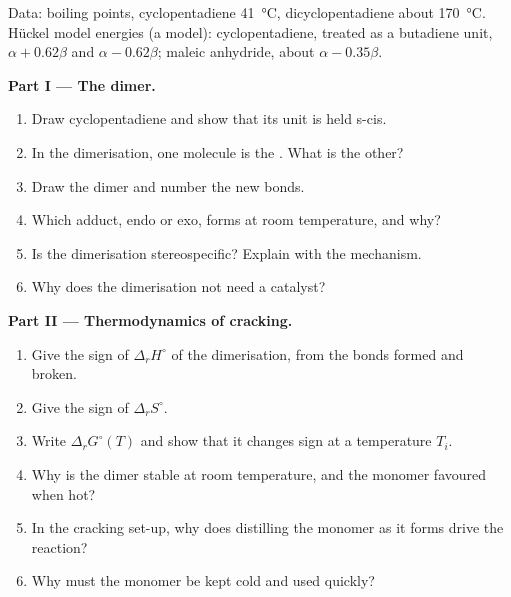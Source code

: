 \begin{problem}
\label{pb:b2:frontier-orbitals:1}
Data: boiling points, cyclopentadiene \qty{41}{\degreeCelsius}, dicyclopentadiene about
\qty{170}{\degreeCelsius}. Hückel model energies (a model): cyclopentadiene, treated as
a butadiene unit,  $\alpha + 0.62\beta$ and  $\alpha - 0.62\beta$; maleic anhydride, 
about $\alpha - 0.35\beta$.

\medskip
\noindent\textbf{Part I --- The dimer.}
\begin{enumerate}
  \item Draw cyclopentadiene and show that its  unit is held s-cis.
  \item In the dimerisation, one molecule is the . What is the other?
  \item Draw the dimer and number the new bonds.
  \item Which adduct, endo or exo, forms at room temperature, and why?
  \item Is the dimerisation stereospecific? Explain with the mechanism.
  \item Why does the dimerisation not need a catalyst?
\end{enumerate}

\medskip
\noindent\textbf{Part II --- Thermodynamics of cracking.}
\begin{enumerate}[resume]
  \item Give the sign of $\Delta_r H^\circ$ of the dimerisation, from the bonds formed and
        broken.
  \item Give the sign of $\Delta_r S^\circ$.
  \item Write $\Delta_r G^\circ(T)$ and show that it changes sign at a temperature $T_i$.
  \item Why is the dimer stable at room temperature, and the monomer favoured when hot?
  \item In the cracking set-up, why does distilling the monomer as it forms drive the
        reaction?
  \item Why must the monomer be kept cold and used quickly?
\end{enumerate}


\end{problem}
